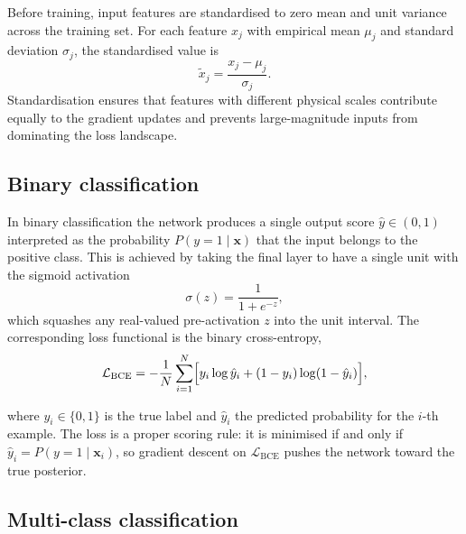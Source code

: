 Before training, input features are standardised to zero mean and unit variance across the training set.  For each feature $x_j$ with empirical mean $\mu_j$ and standard deviation $\sigma_j$, the standardised value is
\begin{equation}
\tilde{x}_{j} = \frac{x_{j} - \mu_{j}}{\sigma_{j}}.
\end{equation}
Standardisation ensures that features with different physical scales contribute equally to the gradient updates and prevents large-magnitude inputs from dominating the loss landscape.
\subsection{Binary classification}
\label{sec:binary}

In binary classification the network produces a single output score $\hat{y}\in(0,1)$ interpreted as the probability $P(y=1\mid\mathbf{x})$ that the input belongs to the positive class.  This is achieved by taking the final layer to have a single unit with the sigmoid activation
\begin{equation}
\sigma(z) = \frac{1}{1+e^{-z}},
\end{equation}
which squashes any real-valued pre-activation $z$ into the unit interval.  The corresponding loss functional is the binary cross-entropy,
\begin{equation}
\mathcal{L}_{\mathrm{BCE}} = -\frac{1}{N}\sum_{i=1}^{N} \Bigl[ y_{i}\log\hat{y}_{i} + (1-y_{i})\log(1-\hat{y}_{i}) \Bigr],
\label{eq:bce}
\end{equation}

where $y_i\in\{0,1\}$ is the true label and $\hat{y}_i$ the predicted probability for the $i$-th example.  The loss is a proper scoring rule: it is minimised if and only if $\hat{y}_i = P(y=1\mid\mathbf{x}_i)$, so gradient descent on $\mathcal{L}_{\mathrm{BCE}}$ pushes the network toward the true posterior.

\subsection{Multi-class classification}
\label{sec:multiclass}

